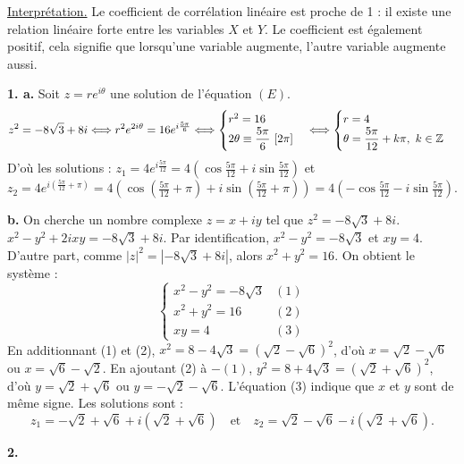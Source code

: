 \documentclass[11pt]{article}
\begin{document}
\underline{Interprétation.} Le coefficient de corrélation linéaire est proche de 1 : il existe une relation linéaire forte entre les variables $X$ et $Y$. Le coefficient est également positif, cela signifie que lorsqu'une variable augmente, l'autre variable augmente aussi.


\textbf{1. a.} Soit $z = re^{i\theta}$ une solution de l'équation $(E)$.
\[ z^2 = -8\sqrt{3} + 8i \Longleftrightarrow r^2 e^{2i\theta} = 16e^{i\frac{5\pi}{6}} \Longleftrightarrow \begin{cases} r^2 = 16 \\ 2\theta \equiv \dfrac{5\pi}{6}\ [2\pi] \end{cases} \Longleftrightarrow \begin{cases} r = 4 \\ \theta = \dfrac{5\pi}{12} + k\pi,\ k \in \mathbb{Z} \end{cases} \]
D'où les solutions : $z_1 = 4e^{i\frac{5\pi}{12}} = 4\left(\cos\tfrac{5\pi}{12} + i\sin\tfrac{5\pi}{12}\right)$ et $z_2 = 4e^{i\left(\frac{5\pi}{12} + \pi\right)} = 4\left(\cos\left(\tfrac{5\pi}{12} + \pi\right) + i\sin\left(\tfrac{5\pi}{12} + \pi\right)\right) = 4\left(-\cos\tfrac{5\pi}{12} - i\sin\tfrac{5\pi}{12}\right)$.

\textbf{b.} On cherche un nombre complexe $z = x + iy$ tel que $z^2 = -8\sqrt{3} + 8i$. $x^2 - y^2 + 2ixy = -8\sqrt{3} + 8i$. Par identification, $x^2 - y^2 = -8\sqrt{3}$ et $xy = 4$. D'autre part, comme $|z|^2 = |-8\sqrt{3} + 8i|$, alors $x^2 + y^2 = 16$. On obtient le système :
\[ \begin{cases} x^2 - y^2 = -8\sqrt{3} & (1) \\ x^2 + y^2 = 16 & (2) \\ xy = 4 & (3) \end{cases} \]
En additionnant (1) et (2), $x^2 = 8 - 4\sqrt{3} = (\sqrt{2} - \sqrt{6})^2$, d'où $x = \sqrt{2} - \sqrt{6}$ ou $x = \sqrt{6} - \sqrt{2}$. En ajoutant (2) à $-(1)$, $y^2 = 8 + 4\sqrt{3} = (\sqrt{2} + \sqrt{6})^2$, d'où $y = \sqrt{2} + \sqrt{6}$ ou $y = -\sqrt{2} - \sqrt{6}$. L'équation (3) indique que $x$ et $y$ sont de même signe. Les solutions sont :
\[ z_1 = -\sqrt{2} + \sqrt{6} + i(\sqrt{2} + \sqrt{6}) \quad \text{et} \quad z_2 = \sqrt{2} - \sqrt{6} - i(\sqrt{2} + \sqrt{6}). \]

\textbf{2.}
\begin{center}
\end{center}
\end{document}
